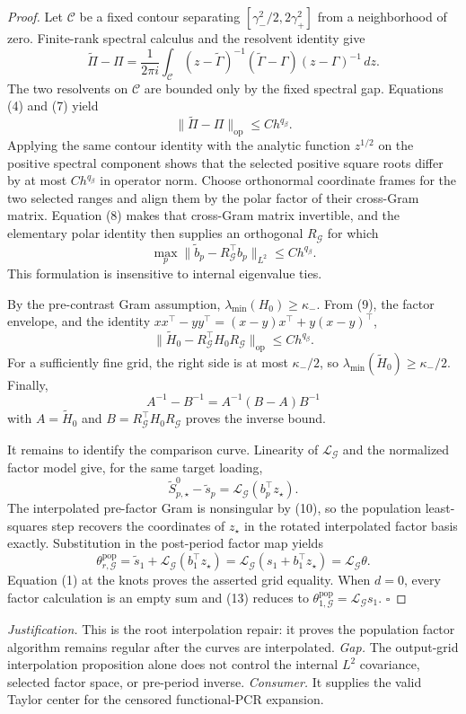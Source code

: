 \documentclass{article}
\begin{document}
\begin{proof}
Let \(\mathscr C\) be a fixed contour separating \([\gamma_-^2/2,2\gamma_+^2]\) from a neighborhood of zero. Finite-rank spectral calculus and the resolvent identity give
\[
 \widetilde\Pi-\Pi
 =\frac{1}{2\pi i}\int_{\mathscr C}
 (z-\widetilde\Gamma)^{-1}(\widetilde\Gamma-\Gamma)(z-\Gamma)^{-1}\,dz. \tag{7}
\]
The two resolvents on \(\mathscr C\) are bounded only by the fixed spectral gap. Equations (4) and (7) yield
\[
 \|\widetilde\Pi-\Pi\|_{\mathrm{op}}\le C h^{q_\beta}. \tag{8}
\]
Applying the same contour identity with the analytic function \(z^{1/2}\) on the positive spectral component shows that the selected positive square roots differ by at most \(Ch^{q_\beta}\) in operator norm. Choose orthonormal coordinate frames for the two selected ranges and align them by the polar factor of their cross-Gram matrix. Equation (8) makes that cross-Gram matrix invertible, and the elementary polar identity then supplies an orthogonal \(R_{\mathcal G}\) for which
\[
 \max_p\|\widetilde b_p-R_{\mathcal G}^{\top}b_p\|_{L^2}
 \le C h^{q_\beta}. \tag{9}
\]
This formulation is insensitive to internal eigenvalue ties.

By the pre-contrast Gram assumption, \(\lambda_{\min}(H_0)\ge\kappa_-\). From (9), the factor envelope, and the identity \(xx^\top-yy^\top=(x-y)x^\top+y(x-y)^\top\),
\[
 \|\widetilde H_0-R_{\mathcal G}^{\top}H_0R_{\mathcal G}\|_{\mathrm{op}}
 \le C h^{q_\beta}. \tag{10}
\]
For a sufficiently fine grid, the right side is at most \(\kappa_-/2\), so \(\lambda_{\min}(\widetilde H_0)\ge\kappa_-/2\). Finally,
\[
 A^{-1}-B^{-1}=A^{-1}(B-A)B^{-1} \tag{11}
\]
with \(A=\widetilde H_0\) and \(B=R_{\mathcal G}^{\top}H_0R_{\mathcal G}\) proves the inverse bound.

It remains to identify the comparison curve. Linearity of \(\mathcal L_{\mathcal G}\) and the normalized factor model give, for the same target loading,
\[
 \widetilde S^0_{p,\star}-\widetilde s_p
 =\mathcal L_{\mathcal G}(b_p^\top z_\star). \tag{12}
\]
The interpolated pre-factor Gram is nonsingular by (10), so the population least-squares step recovers the coordinates of \(z_\star\) in the rotated interpolated factor basis exactly. Substitution in the post-period factor map yields
\[
 \theta^{\mathrm{pop}}_{r,\mathcal G}
 =\widetilde s_1+\mathcal L_{\mathcal G}(b_1^\top z_\star)
 =\mathcal L_{\mathcal G}(s_1+b_1^\top z_\star)
 =\mathcal L_{\mathcal G}\theta. \tag{13}
\]
Equation (1) at the knots proves the asserted grid equality. When \(d=0\), every factor calculation is an empty sum and (13) reduces to \(\theta^{\mathrm{pop}}_{1,\mathcal G}=\mathcal L_{\mathcal G}s_1\). \(\square\)
\end{proof}
\par\smallskip\noindent \textit{Justification.} This is the root interpolation repair: it proves the population factor algorithm remains regular after the curves are interpolated. \textit{Gap.} The output-grid interpolation proposition alone does not control the internal \(L^2\) covariance, selected factor space, or pre-period inverse. \textit{Consumer.} It supplies the valid Taylor center for the censored functional-PCR expansion.
\end{document}
